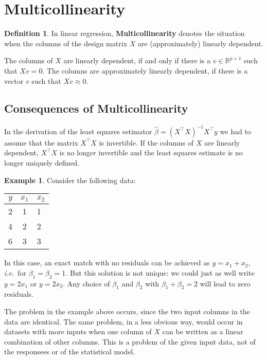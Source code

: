 \documentclass[
  a4paper,
]{article}
\theoremstyle{definition}
\newtheorem{definition}{Definition}[section]
\theoremstyle{definition}
\newtheorem{example}{Example}[section]
\theoremstyle{definition}
\theoremstyle{definition}
\theoremstyle{remark}
\begin{document}
\clearpage

\hypertarget{S10-multicoll}{%
\section{Multicollinearity}\label{S10-multicoll}}

\begin{definition}
In linear regression, \textbf{Multicollinearity} denotes the situation
when the columns of the design matrix \(X\) are (approximately) linearly
dependent.
\end{definition}

The columns of \(X\) are linearly dependent, if and only if
there is a \(v \in \mathbb{R}^{p+1}\) such that \(X v = 0\). The columns
are approximately linearly dependent, if there is a vector \(v\)
such that \(X v \approx 0\).

\hypertarget{consequences-of-multicollinearity}{%
\subsection{Consequences of Multicollinearity}\label{consequences-of-multicollinearity}}

In the derivation of the least squares estimator \(\hat\beta = (X^\top X)^{-1} X^\top y\) we had to assume that the matrix \(X^\top X\) is
invertible. If the columns of \(X\) are linearly dependent, \(X^\top X\) is no
longer invertible and the least squares estimate is no longer uniquely
defined.

\begin{example}
Consider the following data:

\begin{longtable}[]{@{}rcl@{}}
\toprule()
\(y\) & \(x_1\) & \(x_2\) \\
\midrule()
\endhead
2 & 1 & 1 \\
4 & 2 & 2 \\
6 & 3 & 3 \\
\bottomrule()
\end{longtable}

In this case, an exact match with no residuals can be achieved
as \(y = x_1 + x_2\), \emph{i.e.}~for \(\beta_1 = \beta_2 = 1\). But this solution
is not unique: we could just as well write \(y = 2 x_1\) or \(y = 2 x_2\).
Any choice of \(\beta_1\) and \(\beta_2\) with \(\beta_1 + \beta_2 = 2\) will
lead to zero residuals.
\end{example}

The problem in the example above occurs, since the two input columns in the
data are identical. The same problem, in a less obvious way, would occur in
datasets with more inputs when one column of \(X\) can be written as a linear
combination of other columns. This is a problem of the given
input data, not of the responsees or of the statistical model.
\end{document}
